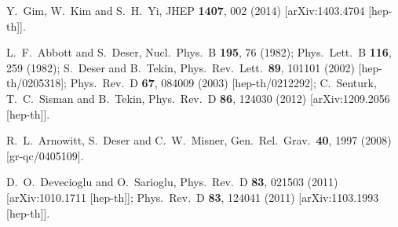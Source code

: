 \documentclass[prd,twocolumn,superscriptaddress,amsmath,amssymb,nofootinbib]{revtex4-1}
\begin{document}
\begin{thebibliography}{99}
  Y.~Gim, W.~Kim and S.~H.~Yi,
  JHEP {\bf 1407}, 002 (2014)
  [arXiv:1403.4704 [hep-th]].

  L.~F.~Abbott and S.~Deser,
  Nucl.\ Phys.\ B {\bf 195}, 76 (1982);
  Phys.\ Lett.\ B {\bf 116}, 259 (1982);
  S.~Deser and B.~Tekin,
  Phys.\ Rev.\ Lett.\  {\bf 89}, 101101 (2002)
  [hep-th/0205318];
  Phys.\ Rev.\ D {\bf 67}, 084009 (2003)
  [hep-th/0212292];
  C.~Senturk, T.~C.~Sisman and B.~Tekin,
  Phys.\ Rev.\ D {\bf 86}, 124030 (2012)
  [arXiv:1209.2056 [hep-th]].

  R.~L.~Arnowitt, S.~Deser and C.~W.~Misner,
  Gen.\ Rel.\ Grav.\  {\bf 40}, 1997 (2008)
  [gr-qc/0405109].

  D.~O.~Devecioglu and O.~Sarioglu,
  Phys.\ Rev.\ D {\bf 83}, 021503 (2011)
  [arXiv:1010.1711 [hep-th]];
  Phys.\ Rev.\ D {\bf 83}, 124041 (2011)
  [arXiv:1103.1993 [hep-th]].


\end{thebibliography}
\end{document}
